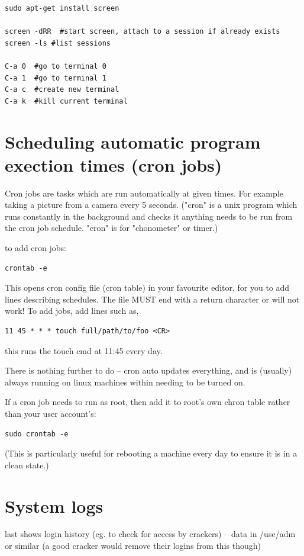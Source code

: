 \documentclass[oneside,english]{scrbook}
\begin{document}
\begin{lstlisting}
sudo apt-get install screen

screen -dRR  #start screen, attach to a session if already exists
screen -ls #list sessions

C-a 0  #go to terminal 0
C-a 1  #go to terminal 1
C-a c  #create new terminal
C-a k  #kill current terminal
\end{lstlisting}

\section{Scheduling automatic program exection times (cron jobs)}

Cron jobs are tasks which are run automatically at given times.  For example taking a picture from a camera every 5 seconds.  ("cron" is a unix program which runs constantly in the background and checks it anything needs to be run from the cron job schedule. "cron" is for "chonometer" or timer.)

to add cron jobs:
\begin{lstlisting}
crontab -e     
\end{lstlisting}
This opens cron config file (cron table) in your favourite editor, for you to add lines describing schedules.  The file MUST end with a return character or will not work!  To add jobs, add lines such as,

\begin{lstlisting}
11 45 * * * touch full/path/to/foo <CR>
\end{lstlisting}
this runs the touch cmd at 11:45 every day.

There is nothing further to do -- cron auto updates everything, and is (usually) always running on linux machines within needing to be turned on.

If a cron job needs to run as root, then add it to root's own chron table rather than your user account's:
\begin{lstlisting}
sudo crontab -e
\end{lstlisting}
(This is particularly useful for rebooting a machine every day to ensure it is in a clean state.)

\section{System logs}

last
shows login history (eg. to check for access by crackers) -- data in /use/adm or similar (a good cracker would remove their logins from this though)
\end{document}
